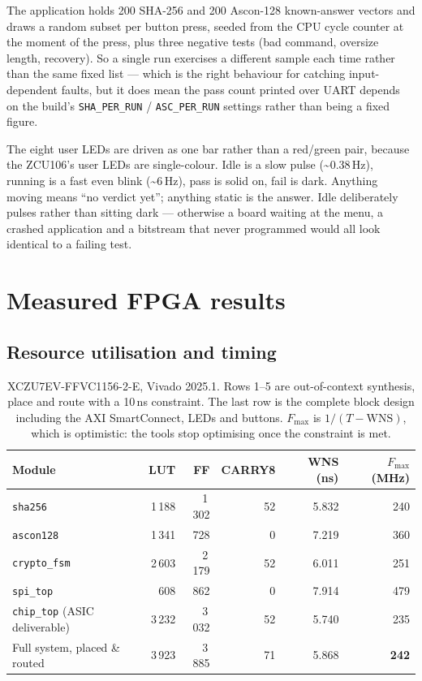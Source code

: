 \documentclass[11pt,a4paper]{article}
\begin{document}
The application holds 200 SHA-256 and 200 Ascon-128 known-answer vectors and
draws a random subset per button press, seeded from the CPU cycle counter at
the moment of the press, plus three negative tests (bad command, oversize
length, recovery). So a single run exercises a different sample each time
rather than the same fixed list --- which is the right behaviour for catching
input-dependent faults, but it does mean the pass count printed over UART
depends on the build's \texttt{SHA\_PER\_RUN} / \texttt{ASC\_PER\_RUN}
settings rather than being a fixed figure.

The eight user LEDs are driven as one bar rather than a red/green pair, because
the ZCU106's user LEDs are single-colour. Idle is a slow pulse
(\textasciitilde 0.38\,Hz), running is a fast even blink
(\textasciitilde 6\,Hz), pass is solid on, fail is dark. Anything moving means
``no verdict yet''; anything static is the answer. Idle deliberately pulses
rather than sitting dark --- otherwise a board waiting at the menu, a crashed
application and a bitstream that never programmed would all look identical to a
failing test.

\section{Measured FPGA results}\label{sec:results}

\subsection{Resource utilisation and timing}

\begin{table}[h]
\centering\small
\begin{tabular}{@{}lrrrrr@{}}
\toprule
\textbf{Module} & \textbf{LUT} & \textbf{FF} & \textbf{CARRY8} &
\textbf{WNS (ns)} & \textbf{$F_{\max}$ (MHz)} \\
\midrule
\texttt{sha256}      & 1\,188 & 1\,302 & 52 & 5.832 & 240 \\
\texttt{ascon128}    & 1\,341 &    728 &  0 & 7.219 & 360 \\
\texttt{crypto\_fsm} & 2\,603 & 2\,179 & 52 & 6.011 & 251 \\
\texttt{spi\_top}    &    608 &    862 &  0 & 7.914 & 479 \\
\midrule
\texttt{chip\_top} (ASIC deliverable) & 3\,232 & 3\,032 & 52 & 5.740 & 235 \\
\midrule
Full system, placed \& routed & 3\,923 & 3\,885 & 71 & 5.868 & \textbf{242} \\
\bottomrule
\end{tabular}
\caption{XCZU7EV-FFVC1156-2-E, Vivado 2025.1. Rows 1--5 are out-of-context
synthesis, place and route with a 10\,ns constraint. The last row is the
complete block design including the AXI SmartConnect, LEDs and buttons.
$F_{\max}$ is $1/(T - \mathrm{WNS})$, which is optimistic: the tools stop
optimising once the constraint is met.}
\label{tab:util}
\end{table}
\end{document}
